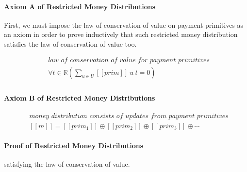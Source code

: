 \paragraph{Axiom A of Restricted Money Distributions}

First, we must impose the law of conservation of value on payment primitives as an axiom in order to
prove inductively that such restricted money distribution satisfies the law of conservation of value
too.

\begin{equation}
    \begin{split}
        &\textit{law of conservation of value for payment primitives} \\
        &\forall t \in \mathbb{R} ({\displaystyle \sum_{u \in U} [\![prim]\!]\ u\ t = 0}) \\
    \end{split}
\end{equation}

\paragraph{Axiom B of Restricted Money Distributions}

\begin{equation}
    \begin{split}
        &\textit{money distribution consists of updates from payment primitives} \\
        &[\![m]\!] = [\![prim_1]\!] \oplus [\![prim_2]\!] \oplus [\![prim_3]\!] \oplus \dotsb
    \end{split}
\end{equation}

\paragraph{Proof of Restricted Money Distributions}

satisfying the law of conservation of value.

